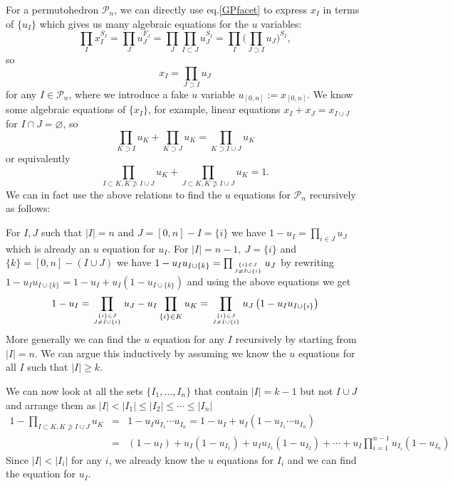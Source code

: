 \documentclass[hidelinks,12pt]{article}
\newcommand{\bea}[1]{\begin{eqnarray}\label{#1} }
\newcommand{\eea}{\end{eqnarray}}
\def\bea{\begin{eqnarray}}
\def\eea{\end{eqnarray}}
\begin{document}
For a permutohedron $\mathscr P_n$, we can directly use eq.\eqref{GPfacet} to express $x_I$ in terms of $\{u_I\}$ which gives us many algebraic equations for the $u$ variables:
\[
\prod_{I}x_I^{S_I}=\prod_{J}u_J^{F_J}=\prod_{J}\prod_{I\subset J}u_J^{S_I}=\prod_{I}\biggl(\prod_{J\supset I}u_J\bigg)^{S_I},
\]
so
\begin{equation}\label{xinu}
x_I=\prod_{J\supset I}u_J
\end{equation}
for any $I\in \mathscr P_n$, where we introduce a fake $u$ variable 
$u_{[0,n]}:=x_{[0,n]}$. We know some algebraic equations of $\{x_I\}$, 
for example, linear equations $x_I+x_J=x_{I\cup J}$ for $I\cap J=\varnothing$, 
so
\begin{equation*}
	\prod_{K\supset I}u_K+\prod_{K\supset J}u_K=\prod_{K\supset I\cup J}u_K
\end{equation*}
or equivalently
\begin{equation}
\prod_{I\subset K,K\not\supset I\cup J}u_K +
\prod_{J\subset K,K\not\supset I\cup J}u_K = 1.
\end{equation}
We can in fact use the above relations to find the $u$ equations for $\mathscr{P}_n$ recursively as follows:

For $I,J$ such that $|I|=n$ and $J=[0,n]-I = \{ i \}$ we have 
$1-u_{I}= \prod_{i \in J} u_{J}$
which is already an $u$ equation for $u_{I}$. For $|I|=n-1,~J=\{i\}$ and $\{k\}=[0,n]-(I\cup J)$ we have 
$1- u_{I}u_{I\cup\{k\}} = \prod_{{\{i\} \in J}\atop{J\neq I\cup\{i\}}} u_J $ by rewriting $1- u_{I}u_{I\cup\{k\}}  =1-u_{I}+u_{I}(1-u_{I\cup\{k\}})$ and using the above equations we get 
\bea
1-u_{I}=\prod_{{\{i\} \in J}\atop{J\neq I\cup\{i\}}} u_J - u_{I} \prod_{\{i\} \in K} u_K =\prod_{{\{i\} \in J}\atop{J\neq I\cup\{i\}}} u_J \left(1- u_{I}  u_{I\cup\{i\}}\right)
\eea
More generally we can find the $u$ equation for any $I$ recursively by starting from $|I|=n$. We can argue this inductively by assuming we know the $u$ equations for all $I$ such that $|I|\geq k$.

We can now look at all the sets $\{I_1,\dots,I_n\}$ that contain $|I|=k-1$ but not $I\cup J$ and arrange them as $|I|<|I_1|\leq |I_2|\leq \cdots \leq |I_n|$
\bea
1-\prod_{I\subset K,K\not\supset I\cup J}u_K &=&1-u_{I}u_{I_1}\cdots u_{I_n}= 1-u_I+u_I(1-u_{I_1}\cdots u_{I_n})\nonumber \\
&=&(1-u_I)+u_I(1-u_{I_1})+u_I u_{I_1}(1-u_{I_2})+\cdots+u_I\prod_{i=1}^{n-1}u_{I_{i}}(1-u_{I_n})
\eea
Since $|I|< |I_i|$ for any $i$, we already know the $u$ equations for $I_i$ and we can find the equation for $u_I$.
\end{document}
